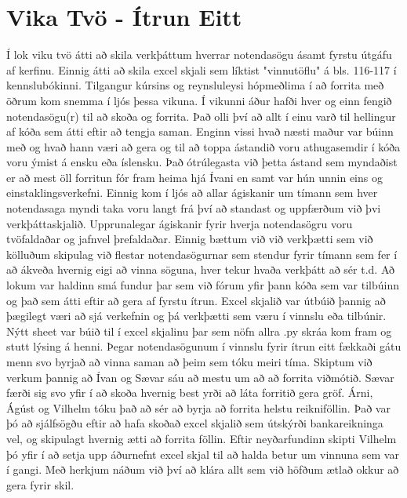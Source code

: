 \documentclass[a4paper, 12 pt]{article}
\begin{document}
\section{Vika Tvö - Ítrun Eitt}
Í lok viku tvö átti að skila verkþáttum hverrar notendasögu ásamt fyrstu útgáfu af kerfinu.  Einnig átti að skila excel skjali sem líktist "vinnutöflu" á bls. 116-117 í kennslubókinni.  Tilgangur kúrsins og reynsluleysi hópmeðlima í að forrita með öðrum kom snemma í ljós þessa vikuna.  Í vikunni áður hafði hver og einn fengið notendasögu(r) til að skoða og forrita.  Það olli því að allt í einu varð til hellingur af kóða sem átti eftir að tengja saman.  Enginn vissi hvað næsti maður var búinn með og hvað hann væri að gera og til að toppa ástandið voru athugasemdir í kóða voru ýmist á ensku eða íslensku.  Það ótrúlegasta við þetta ástand sem myndaðist er að mest öll forritun fór fram heima hjá Ívani en samt var hún unnin eins og einstaklingsverkefni.  Einnig kom í ljós að allar ágiskanir um tímann sem hver notendasaga myndi taka voru langt frá því að standast og uppfærðum við þvi verkþáttaskjalið.  Upprunalegar ágiskanir fyrir hverja notendasögru voru tvöfaldaðar og jafnvel þrefaldaðar.  Einnig bættum við við verkþætti sem við kölluðum skipulag við flestar notendasögurnar sem stendur fyrir tímann sem fer í að ákveða hvernig eigi að vinna söguna, hver tekur hvaða verkþátt að sér t.d.  
Að lokum var haldinn smá fundur þar sem við fórum yfir þann kóða sem var tilbúinn og það sem átti eftir að gera af fyrstu ítrun.  Excel skjalið var útbúið þannig að þægilegt væri að sjá verkefnin og þá verkþætti sem væru í vinnslu eða tilbúnir.  Nýtt sheet var búið til í excel skjalinu þar sem nöfn allra .py skráa kom fram og stutt lýsing á henni.  Þegar notendasögunum í vinnslu fyrir ítrun eitt fækkaði gátu menn svo byrjað að vinna saman að þeim sem tóku meiri tíma.
Skiptum við verkum þannig að Ívan og Sævar sáu að mestu um að að forrita viðmótið.  Sævar færði sig svo yfir í að skoða hvernig best yrði að láta forritið gera gröf.  Árni, Ágúst og Vilhelm tóku það að sér að byrja að forrita helstu reikniföllin.  Það var þó að sjálfsögðu eftir að hafa skoðað excel skjalið sem útskýrði bankareikninga vel, og skipulagt hvernig ætti að forrita föllin.  Eftir neyðarfundinn skipti Vilhelm þó yfir í að setja upp áðurnefnt excel skjal til að halda betur um vinnuna sem var í gangi.  
Með herkjum náðum við því að klára allt sem við höfðum ætlað okkur að gera fyrir skil. 
\end{document}
